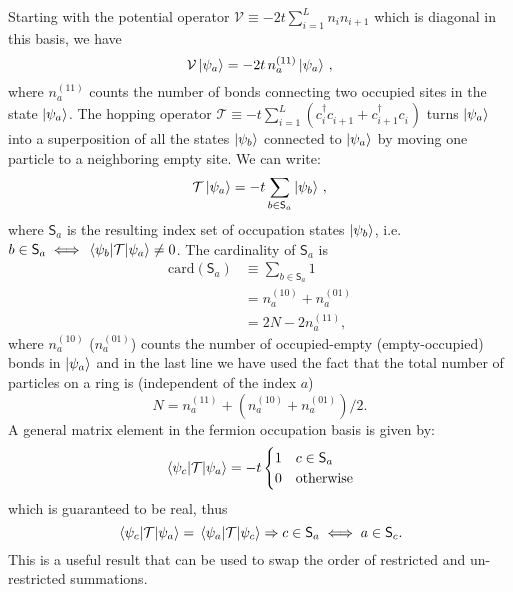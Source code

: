 Starting with the potential operator $\mathcal{V} \equiv -2t \sum_{i=1}^L n_i n_{i+1}$ which is diagonal in this basis, we have
%
\begin{equation}
    \mathcal{V}\ket{\psi_a} =-2t\, n^{(11)}_a\ket{\psi_a}\, ,
    \label{eq:Vpsia}
\end{equation}
%
where $ n^{(11)}_a$ counts the number of bonds connecting two occupied sites in the state $\ket{\psi_a}$. The hopping operator $\mathcal{T} \equiv -t \sum_{i=1}^L (c_{i}^\dagger c_{i+1}^{\phantom{\dagger}} + c_{i+1}^\dagger c_{i}^{\phantom{\dagger}})$ turns $\ket{\psi_a}$ into a superposition of all the states $\ket{\psi_b}$ connected to $\ket{\psi_a}$ by moving one particle to a neighboring empty site. We can write: 
%
\begin{equation}
    \mathcal{T}\ket{\psi_a} =-t \sum_{b \in \mathsf{S}_a}\ket{\psi_b}\, ,
    \label{eq:Tpsia}
\end{equation}
%
where $\mathsf{S}_a$ is the resulting index set of occupation states $\ket{\psi_b}$,
i.e. $b \in \mathsf{S}_a \iff \matrixel{\psi_b}{\mathcal{T}}{\psi_a} \ne 0$.  
The cardinality of $\mathsf{S}_a$ is
%
\begin{align}
    \mathrm{card}(\mathsf{S}_a) &\equiv \sum_{b \in \mathsf{S}_a} 1\nonumber \\
    &= n^{(10)}_a+n^{(01)}_a \nonumber \\
    &= 2N - 2n_a^{(11)}, 
\label{eq:cardSa}
\end{align}
where $n^{(10)}_a$ ($n^{(01)}_a$) counts the number of occupied-empty
(empty-occupied) bonds in $\ket{\psi_a}$ and in the last line we have used the fact
that the total number of particles on a ring is (independent of the index $a$)
%
\begin{equation}
 N=n^{(11)}_a+(n^{(10)}_a+n^{(01)}_a)/2 .
\label{eq:Nring}
\end{equation}
%
A general matrix element in the fermion occupation basis is given by:
%
\begin{equation}
    \matrixel{\psi_c}{\mathcal{T}}{\psi_a} = -t
    \begin{cases}
        1 & c \in \mathsf{S}_a \\
        0 & \text{otherwise}
    \end{cases}
\label{eq:Tmatrixelemnts}
\end{equation}
%
which is guaranteed to be real, thus 
%
\begin{equation}
\matrixel{\psi_c}{\mathcal{T}}{\psi_a} = 
\matrixel{\psi_a}{\mathcal{T}}{\psi_c} \Rightarrow c \in \mathsf{S}_a \iff a \in
    \mathsf{S}_c.
\label{eq:setSwitch}
\end{equation}
%
This is a useful result that can be used to swap the order of restricted and
un-restricted summations.

